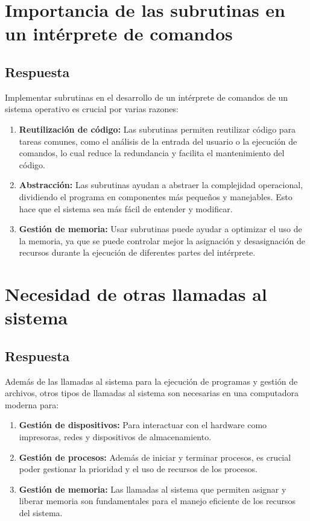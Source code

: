 \documentclass{article}
\begin{document}
\section{Importancia de las subrutinas en un intérprete de comandos}
\subsection{Respuesta}
Implementar subrutinas en el desarrollo de un intérprete de comandos de un sistema operativo es crucial por varias razones:
\begin{enumerate}
    \item \textbf{Reutilización de código:} Las subrutinas permiten reutilizar código para tareas comunes, como el análisis de la entrada del usuario o la ejecución de comandos, lo cual reduce la redundancia y facilita el mantenimiento del código.
    \item \textbf{Abstracción:} Las subrutinas ayudan a abstraer la complejidad operacional, dividiendo el programa en componentes más pequeños y manejables. Esto hace que el sistema sea más fácil de entender y modificar.
    \item \textbf{Gestión de memoria:} Usar subrutinas puede ayudar a optimizar el uso de la memoria, ya que se puede controlar mejor la asignación y desasignación de recursos durante la ejecución de diferentes partes del intérprete.
\end{enumerate}

\section{Necesidad de otras llamadas al sistema}
\subsection{Respuesta}
Además de las llamadas al sistema para la ejecución de programas y gestión de archivos, otros tipos de llamadas al sistema son necesarias en una computadora moderna para:
\begin{enumerate}
    \item \textbf{Gestión de dispositivos:} Para interactuar con el hardware como impresoras, redes y dispositivos de almacenamiento.
    \item \textbf{Gestión de procesos:} Además de iniciar y terminar procesos, es crucial poder gestionar la prioridad y el uso de recursos de los procesos.
    \item \textbf{Gestión de memoria:} Las llamadas al sistema que permiten asignar y liberar memoria son fundamentales para el manejo eficiente de los recursos del sistema.
\end{enumerate}
\end{document}
